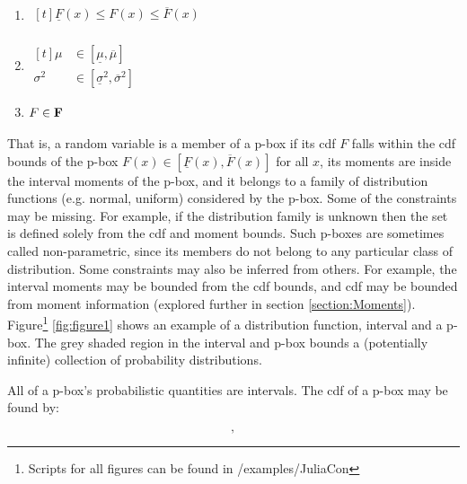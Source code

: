\documentclass{juliacon}
\begin{document}
\begin{enumerate}
  \item $\begin{aligned}[t]
    \underline{F}(x) \leq F(x) \leq \overline{F}(x) \\%
  \end{aligned}$
  \item $\begin{aligned}[t]
    \mu &\in [\underline{ \mu }, \overline{ \mu }]  \\%
    \sigma^2 &\in [\underline{\sigma}^2 , \overline{\sigma}^2]
  \end{aligned}$
  \item $\begin{aligned}[t]
      F \in \bold{F} \\%
  \end{aligned}$
  \end{enumerate}

\noindent That is, a random variable is a member of a p-box if its cdf $F$ falls within the cdf bounds of the p-box $F(x) \in [\underline{F}(x), \overline{F}(x)]$ for all $x$, its moments are inside the interval moments of the p-box, and it belongs to a family of distribution functions (e.g. normal, uniform) considered by the p-box. Some of the constraints may be missing. For example, if the distribution family is unknown then the set is defined solely from the cdf and moment bounds. Such p-boxes are sometimes called non-parametric, since its members do not belong to any particular class of distribution. Some constraints may also be inferred from others. For example, the interval moments may be bounded from the cdf bounds, and cdf may be bounded from moment information (explored further in section \ref{section:Moments}). Figure\footnote{Scripts for all figures can be found in /examples/JuliaCon} \ref{fig:figure1} shows an example of a distribution function, interval and a p-box. The grey shaded region in the interval and p-box bounds a (potentially infinite) collection of probability distributions.

All of a p-box's probabilistic quantities are intervals. The cdf of a p-box may be found by: 

\begin{equation*}
  [\underline{F}(x), \overline{F}(x)] ,
\end{equation*}
\end{document}
